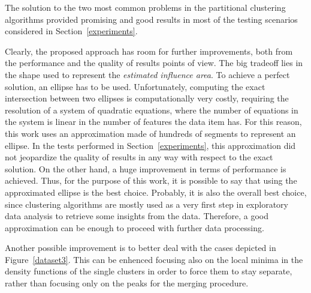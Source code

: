 The solution to the two most common problems in the partitional clustering
algorithms provided promising and good results in most of the testing
scenarios considered in Section~\ref{experiments}.

Clearly, the proposed approach has room for further improvements, both from
the performance and the quality of results points of view. The big tradeoff
lies in the shape used to represent the \emph{estimated influence area}. To
achieve a perfect solution, an ellipse has to be used. Unfortunately, computing
the exact intersection between two ellipses is computationally very costly,
requiring the resolution of a system of quadratic equations, where the number
of equations in the system is linear in the number of features the data item has.
For this reason, this work uses an approximation made of hundreds of segments
to represent an ellipse. In the tests performed in Section~\ref{experiments},
this approximation did not jeopardize the quality of results in any way with
respect to the exact solution. On the other hand, a huge improvement in terms
of performance is achieved. Thus, for the purpose of this work, it is possible
to say that using the approximated ellipse is the best choice. Probably, it is
also the overall best choice, since clustering algorithms are mostly used as 
a very first step in exploratory data analysis to retrieve some insights from
the data. Therefore, a good approximation can be enough to proceed with
further data processing.

Another possible improvement is to better deal with the cases depicted in
Figure~\ref{dataset3}. This can be enhenced focusing also on the local minima
in the density functions of the single clusters in order to force them to stay 
separate, rather than focusing only on the peaks for the merging procedure.